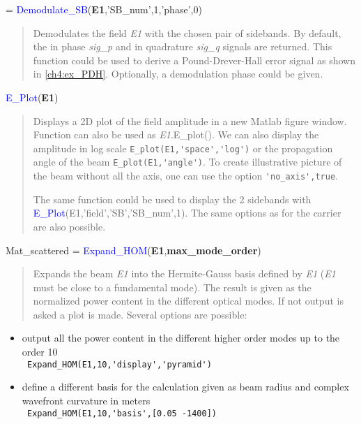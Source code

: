  = \textcolor{blue}{Demodulate\_SB}(\textbf{E1},'SB\_num',1,'phase',0)
\vspace*{-0.2cm}
\begin{quote}
Demodulates the field \textsl{E1} with the chosen pair of sidebands. By default, the in phase \textsl{sig\_p} and in quadrature \textsl{sig\_q} signals are returned. This function could be used to derive a Pound-Drever-Hall error signal as shown in \ref{ch4:ex_PDH}. Optionally, a demodulation phase could be given.
\end{quote}

\noindent \textcolor{blue}{E\_Plot}(\textbf{E1})
\vspace*{-0.2cm}
\begin{quote}
Displays a 2D plot of the field amplitude in a new Matlab figure window. Function can also be used as \textsl{E1}.E\_plot(). We can also display the amplitude in log scale \verb?E_plot(E1,'space','log')? or the propagation angle of the beam \verb?E_plot(E1,'angle')?. To create illustrative picture of the beam without all the axis, one can use the option \verb?'no_axis',true?.

The same function could be used to display the 2 sidebands with \textcolor{blue}{E\_Plot}(E1,'field','SB','SB\_num',1). The same options as for the carrier are also possible.
\end{quote}


\noindent Mat\_scattered = \textcolor{blue}{Expand\_HOM}(\textbf{E1},\textbf{max\_mode\_order})
\vspace*{-0.2cm}
\begin{quote}
Expands the beam \textsl{E1} into the Hermite-Gauss basis defined by \textsl{E1} (\textsl{E1} must be close to a fundamental mode). The result is given as the normalized power content in the different optical modes. If not output is asked a plot is made. Several options are possible:
\end{quote}
\begin{itemize}
  \item output all the power content in the different higher order modes up to the order 10 \\
        \verb? Expand_HOM(E1,10,'display','pyramid') ?
  \item define a different basis for the calculation given as beam radius and complex wavefront curvature in meters\\
        \verb? Expand_HOM(E1,10,'basis',[0.05 -1400]) ?
\end{itemize}

